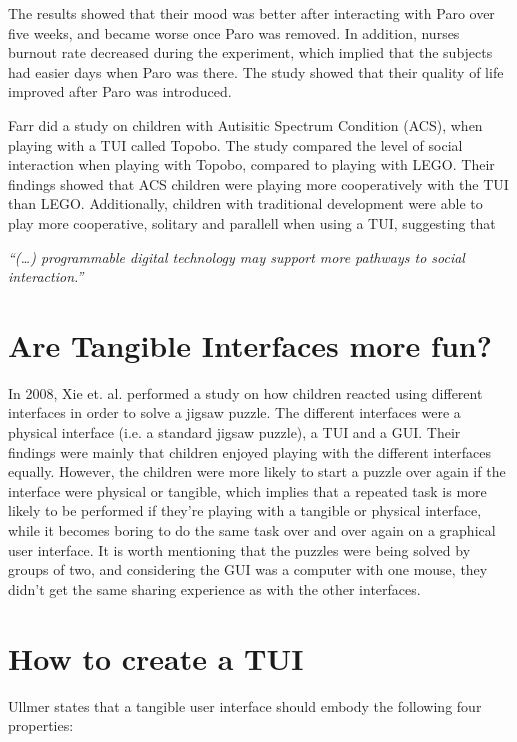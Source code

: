 The results showed that their mood was better after interacting with Paro over five weeks, and became worse once Paro was removed. In addition, nurses burnout rate decreased during the experiment, which implied that the subjects had easier days when Paro was there. The study showed that their quality of life improved after Paro was introduced.           

Farr \etal{} did a study on children with Autisitic Spectrum Condition (ACS), when playing with a TUI called Topobo\cite{farr2010social}. The study compared the level of social interaction when playing with Topobo, compared to playing with LEGO. Their findings showed that ACS children were playing more cooperatively with the TUI than LEGO. Additionally, children with traditional development were able to play more cooperative, solitary and parallell when using a TUI, suggesting that 

\textit{``(\ldots) programmable digital technology may support more pathways to social interaction.''}

 
\section{Are Tangible Interfaces more fun?}
\label{sec:aretuisfun}
In 2008, Xie et. al. performed a study on how children reacted using different interfaces in order to solve a jigsaw puzzle\cite{xie2008tangibles}. The different interfaces were a physical interface (i.e. a standard jigsaw puzzle), a TUI and a GUI. Their findings were mainly that children enjoyed playing with the different interfaces equally. However, the children were more likely to start a puzzle over again if the interface were physical or tangible, which implies that a repeated task is more likely to be performed if they're playing with a tangible or physical interface, while it becomes boring to do the same task over and over again on a graphical user interface. It is worth mentioning that the puzzles were being solved by groups of two, and considering the GUI was a computer with one mouse, they didn't get the same sharing experience as with the other interfaces. 


\section{How to create a TUI}
Ullmer states that a tangible user interface should embody the following four properties\cite{ullmer2002tangible}:

